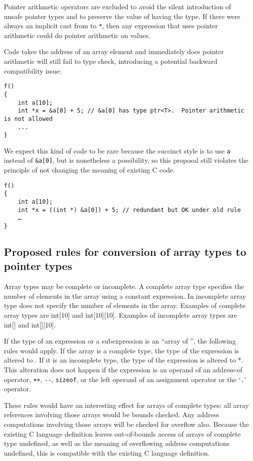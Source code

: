 Pointer arithmetic operators are excluded to avoid the silent
introduction of unsafe pointer types and to preserve the value of having
the \ptrT type. If
there were always an implicit cast from \ptrT to  \texttt{*},
then any expression that uses pointer arithmetic could do pointer
arithmetic on \ptrT
values.

Code takes the address of an array element and immediately does pointer
arithmetic will still fail to type check, introducing a potential
backward compatibility issue:
\begin{verbatim}
f()
{
    int a[10];
    int *x = &a[0] + 5; // &a[0] has type ptr<T>.  Pointer arithmetic is not allowed
    ...
}
\end{verbatim}

We expect this kind of code to be rare because the succinct style is to
use \texttt{a} instead of \texttt{\&a[0]}, but is nonetheless a
possibility, so this proposal still violates the principle of not
changing the meaning of existing C code.

\begin{verbatim}
f()
{
    int a[10];
    int *x = ((int *) &a[0]) + 5; // redundant but OK under old rule
    …
}
\end{verbatim}

\subsection{Proposed rules for conversion of array types to pointer types}\label{proposed-rules-for-conversion-of-array-types-to-pointer-types}

Array types may be complete or incomplete. A complete array type
specifies the number of elements in the array using a constant
expression. In incomplete array type does not specify the number of
elements in the array. Examples of complete array types are int[10]
and int[10][10]. Examples of incomplete array types are
int[] and int[][10].

If the type of an expression or a subexpression is an ``array of
'', the following rules would apply. If the array is a complete
type, the type of the expression is altered to
\arrayptrT . If it is
an incomplete type, the type of the expression is altered to  *.
This alteration does not happen if the expression is an operand of an
address-of operator, \texttt{++}, \texttt{-\/-}, \texttt{sizeof}, or the
left operand of an assignment operator or the `\texttt{.}' operator.

These rules would have an interesting effect for arrays of complete
types: all array references involving those arrays would be bounds
checked. Any address computations involving those arrays will be checked
for overflow also. Because the existing C language definition leaves
out-of-bounds access of arrays of complete type undefined, as well as
the meaning of overflowing address computations undefined, this is
compatible with the existing C language definition.

